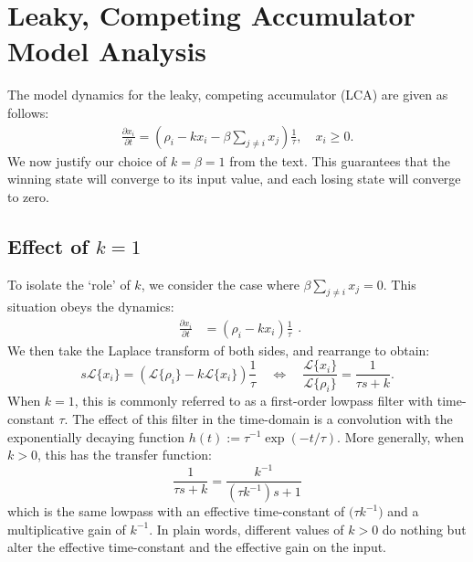 \chapter{Leaky, Competing Accumulator Model Analysis}\label{sec:apdx-wta}

The model dynamics for the leaky, competing accumulator (LCA) are given as follows:
\begin{equation}
    \begin{split}
        \frac{{\partial x}_i}{\partial t} = \left(\rho_i - kx_i - \beta \sum_{j \neq i} x_j\right) \frac{1}{\tau}, \quad x_i \ge 0 .
    \end{split}
\end{equation}
We now justify our choice of $k = \beta = 1$ from the text.
This guarantees that the winning state will converge to its input value, and each losing state will converge to zero.

\section{Effect of \texorpdfstring{$k = 1$}{k=1}}

To isolate the `role' of $k$, we consider the case where $\beta \sum_{j \ne i} x_j = 0$. 
This situation obeys the dynamics:
\begin{equation}
    \begin{split}
        \frac{{\partial x}_i}{\partial t} &= \left(\rho_i - kx_i\right) 
        \frac{1}{\tau}
    \end{split}.
\end{equation}
We then take the Laplace transform of both sides, and rearrange to obtain:
\begin{equation}
s\mathcal{L}\{x_i\} = \left( \mathcal{L}\{\rho_i\} - k\mathcal{L}\{x_i\} \right) \frac{1}{\tau} \quad \iff \quad \frac{\mathcal{L}\{x_i\}}{\mathcal{L}\{\rho_i\}} = \frac{1}{\tau s + k}.
\end{equation}
When $k = 1$, this is commonly referred to as a first-order lowpass filter with time-constant $\tau$.
The effect of this filter in the time-domain is a convolution with the exponentially decaying function $h(t) := \tau^{-1} \exp\left( -t / \tau \right)$.
More generally, when $k > 0$, this has the transfer function:
\begin{equation}
\frac{1}{\tau s + k} = \frac{k^{-1}}{(\tau k^{-1})s + 1}
\end{equation}
which is the same lowpass with an effective time-constant of $\big(\!\tau k^{-1}\big)$ and a multiplicative gain of $k^{-1}$.
In plain words, different values of $k > 0$ do nothing but alter the effective time-constant and the effective gain on the input.

